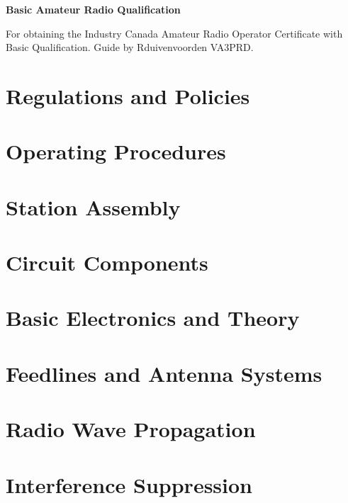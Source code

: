 \documentclass[12pt,letterpaper,fleqn,oneside]{article}
\begin{document}
\LARGE{\textbf{Basic Amateur Radio Qualification}}

\normalsize For obtaining the Industry Canada Amateur Radio Operator Certificate with Basic Qualification. Guide by Rduivenvoorden VA3PRD.


\section{Regulations and Policies}

\section{Operating Procedures}

\section{Station Assembly}

\section{Circuit Components}

\section{Basic Electronics and Theory}

\section{Feedlines and Antenna Systems}

\section{Radio Wave Propagation}

\section{Interference Suppression}
\end{document}
